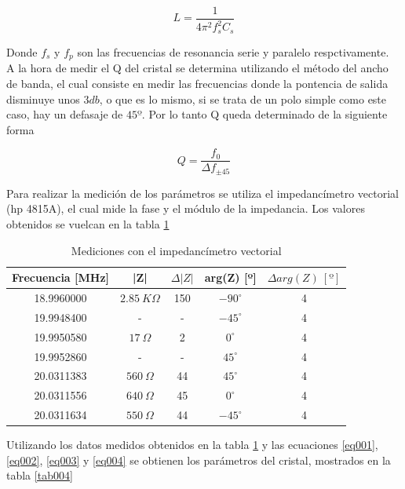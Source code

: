 \documentclass[a4paper,10pt]{article}
\begin{document}
		\begin{equation} \label{eq003}
			L = \frac{1}{4\pi^2f_s^2C_s}
		\end{equation}

		\indent Donde $f_s$ y $f_p$ son las frecuencias de resonancia serie y 
		paralelo respctivamente. \\
		\indent A la hora de medir el Q del cristal se determina utilizando el 
		método del ancho de banda, el cual consiste en medir las frecuencias 
		donde la pontencia de salida disminuye unos $3db$, o que es lo mismo, 
		si se trata de un polo simple como este caso, hay un defasaje de $45º$.
		Por lo tanto Q queda determinado de la siguiente forma
		
		\begin{equation} \label{eq004}
			Q = \frac{f_0}{\Delta f_{\pm45}}
		\end{equation}
		
		\indent Para realizar la medición de los parámetros se utiliza el 
		impedancímetro vectorial (hp 4815A), el cual mide la fase y el módulo de
		la impedancia. Los valores obtenidos se vuelcan en la tabla \ref{tab003}
		
		\begin{table}[!htp]
			\centering
			\begin{tabular}{|c|c|c|c|c|}
				\hline
				Frecuencia [MHz] & |Z| & $\Delta |Z|$ & arg(Z) [º] & 
				$\Delta arg(Z)~[º]$ \\
				\hline
				18.9960000 & $2.85~K\Omega$ & 150 & $-90^{\circ}$ & 4 \\
				\hline
				19.9948400 & - & - & $-45^{\circ}$ & 4 \\ 
				\hline
				19.9950580 & $17~\Omega$ & 2 & $0^{\circ}$ & 4 \\
				\hline
				19.9952860 & - & - & $45^{\circ}$ & 4 \\ 
				\hline									
				20.0311383 & $560~\Omega$ & 44 & $45^{\circ}$ & 4 \\
				\hline									
				20.0311556 & $640~\Omega$ & 45 & $0^{\circ}$ & 4 \\
				\hline									
				20.0311634 & $550~\Omega$ & 44 & $-45^{\circ}$ & 4 \\
				\hline									
			\end{tabular}
			\caption{Mediciones con el impedancímetro vectorial} \label{tab003}
		\end{table}	
		
		\indent Utilizando los datos medidos obtenidos en la tabla \ref{tab003}
		y las ecuaciones \ref{eq001}, \ref{eq002}, \ref{eq003} y \ref{eq004} se
		obtienen los parámetros del cristal, mostrados en la tabla \ref{tab004}
		
\end{document}
